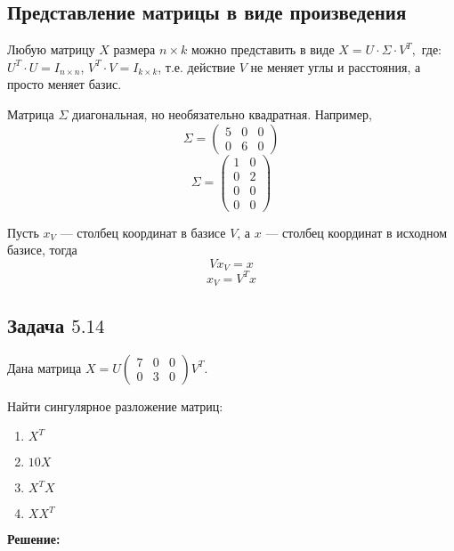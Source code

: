 \documentclass[12pt]{article} %
\theoremstyle{definition} %
\begin{document}
\subsection{Представление матрицы в виде произведения}
Любую матрицу $X$ размера $n \times k$ можно представить в виде $X = U \cdot \Sigma \cdot V^T,$ где:
$U^T\cdot U = I_{n \times n}$, $V^T\cdot V = I_{k \times k}$, т.е. действие $V$ не меняет углы и расстояния, а просто меняет базис.

Матрица $\Sigma$ диагональная, но необязательно квадратная. Например, \[\Sigma= \begin{pmatrix}
5 & 0 & 0  \\
0 & 6 & 0
\end{pmatrix}
\]
\[\Sigma= \begin{pmatrix}
1 & 0  \\
0 & 2  \\
0 & 0  \\
0 & 0
\end{pmatrix}
\]

Пусть $x_V$ — столбец координат в базисе $V$, а $x$ — столбец координат в исходном базисе, тогда
\[Vx_V=x
\]
\[x_V=V^T x
\]

\subsection{Задача \href{https://github.com/bdemeshev/metrics_pro/raw/master/metrics_pro.pdf}{$5.14$}}
Дана матрица
$X= U\begin{pmatrix}
7 & 0 & 0 \\
0 & 3 & 0
\end{pmatrix} V^T$.

Найти сингулярное разложение матриц:

\begin{enumerate}
\item $X^T$
\item $10X$
\item $X^TX$
\item $XX^T$
\end{enumerate}

\textbf{Решение:}
\end{document}
